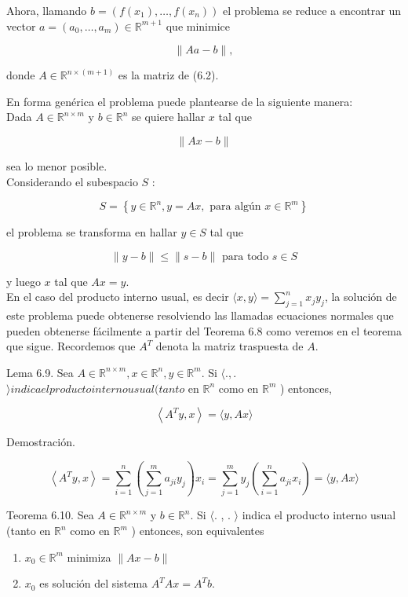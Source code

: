 \documentclass[10pt]{book}
\begin{document}
Ahora, llamando $b=\left(f\left(x_{1}\right), \ldots, f\left(x_{n}\right)\right)$ el problema se reduce a encontrar un vector $a= \left(a_{0}, \ldots, a_{m}\right) \in \mathbb{R}^{m+1}$ que minimice

$$
\|A a-b\|,
$$

donde $A \in \mathbb{R}^{n \times(m+1)}$ es la matriz de (6.2).

En forma genérica el problema puede plantearse de la siguiente manera:\\
Dada $A \in \mathbb{R}^{n \times m}$ y $b \in \mathbb{R}^{n}$ se quiere hallar $x$ tal que

$$
\|A x-b\|
$$

sea lo menor posible.\\
Considerando el subespacio $S$ :

$$
S=\left\{y \in \mathbb{R}^{n}, y=A x, \text { para algún } x \in \mathbb{R}^{m}\right\}
$$

el problema se transforma en hallar $y \in S$ tal que

$$
\|y-b\| \leq\|s-b\| \text { para todo } s \in S
$$

y luego $x$ tal que $A x=y$.\\
En el caso del producto interno usual, es decir $\langle x, y\rangle=\sum_{j=1}^{n} x_{j} y_{j}$, la solución de este problema puede obtenerse resolviendo las llamadas ecuaciones normales que pueden obtenerse fácilmente a partir del Teorema 6.8 como veremos en el teorema que sigue. Recordemos que $A^{T}$ denota la matriz traspuesta de $A$.

Lema 6.9. Sea $A \in \mathbb{R}^{n \times m}, x \in \mathbb{R}^{n}, y \in \mathbb{R}^{m}$. Si $\langle.,$.$\rangle indica el producto interno usual (tanto$ en $\mathbb{R}^{n}$ como en $\mathbb{R}^{m}$ ) entonces,

$$
\left\langle A^{T} y, x\right\rangle=\langle y, A x\rangle
$$

Demostración.

$$
\left\langle A^{T} y, x\right\rangle=\sum_{i=1}^{n}\left(\sum_{j=1}^{m} a_{j i} y_{j}\right) x_{i}=\sum_{j=1}^{m} y_{j}\left(\sum_{i=1}^{n} a_{j i} x_{i}\right)=\langle y, A x\rangle
$$

Teorema 6.10. Sea $A \in \mathbb{R}^{n \times m}$ y $b \in \mathbb{R}^{n}$. Si $\langle$. , . $\rangle$ indica el producto interno usual (tanto en $\mathbb{R}^{n}$ como en $\mathbb{R}^{m}$ ) entonces, son equivalentes

\begin{enumerate}
  \item $x_{0} \in \mathbb{R}^{m}$ minimiza $\|A x-b\|$
  \item $x_{0}$ es solución del sistema $A^{T} A x=A^{T} b$.
\end{enumerate}
\end{document}
